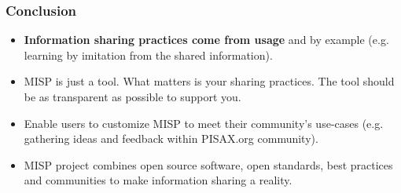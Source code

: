 \begin{frame}
        \frametitle{Conclusion}
        \begin{itemize}
                \item {\bf Information sharing practices come from usage} and by example (e.g. learning by imitation from the shared information).
                \item MISP is just a tool. What matters is your sharing practices. The tool should be as transparent as possible to support you.
                \item Enable users to customize MISP to meet their community's use-cases (e.g. gathering ideas and feedback within PISAX.org community).
                \item MISP project combines open source software, open standards, best practices and communities to make information sharing a reality.
        \end{itemize}
\end{frame}


